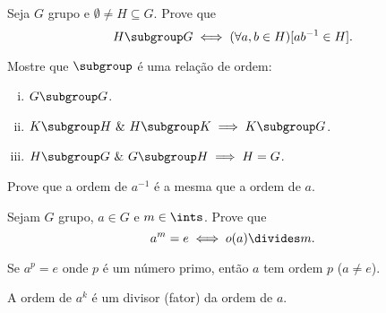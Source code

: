 \begin{exercise}
	Seja $G$ grupo e $\emptyset \neq H \subseteq G$. Prove que
	$$
		H \subgroup G \iff (\forall a,b \in H)[ab^{-1} \in H].
	$$
\end{exercise}

\begin{exercise}
	Mostre que $\subgroup$ é uma relação de ordem:
	\begin{enumerate}[(i)]
		\item $G \subgroup G$.
		\item $K \subgroup H \ \&\ H \subgroup K \implies K \subgroup G$.
		\item $H \subgroup G \ \&\ G \subgroup H \implies H = G$.
	\end{enumerate}
\end{exercise}

\begin{exercise}
	Prove que a ordem de $a^{-1}$ é a mesma que a ordem de $a$.
\end{exercise}

\begin{exercise}
	Sejam $G$ grupo, $a \in  G$ e $m \in \ints$. Prove que
	$$
		a^{m} = e \iff o(a) \divides m. 
	$$
\end{exercise}

\begin{exercise}
	Se $a^p = e$ onde $p$ é um número primo, então $a$ tem ordem $p$ ($a \neq e$).
\end{exercise}

\begin{exercise}
	A ordem de $a^k$ é um divisor (fator) da ordem de $a$.
\end{exercise}
